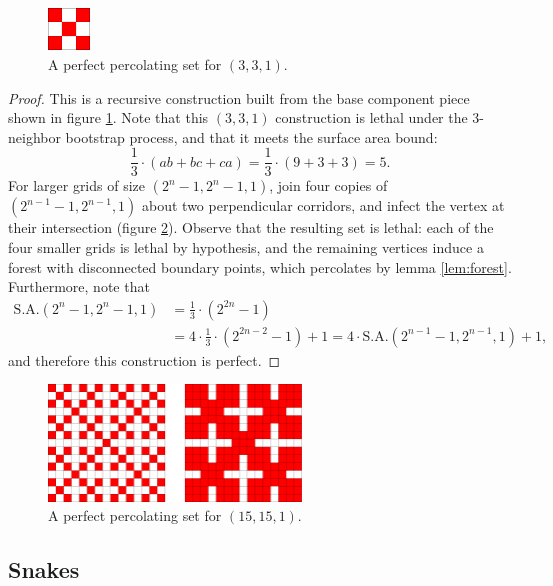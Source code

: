 \begin{figure}[]
\centering
\includegraphics[width=0.1\textwidth]{figures/7/3x3x1.pdf}
\caption{A perfect percolating set for $(3,3,1)$.}
\label{fig:3x3x1}
\end{figure} 

\begin{proof}
This is a recursive construction built from the base component piece shown in figure \ref{fig:3x3x1}. Note that this $(3,3,1)$ construction is lethal under the 3-neighbor bootstrap process, and that it meets the surface area bound:
$$\frac{1}{3} \cdot (ab+bc+ca) = \frac{1}{3} \cdot (9 + 3 + 3) = 5.$$
For larger grids of size $(2^n-1, 2^n-1, 1)$, join four copies of $(2^{n-1}-1, 2^{n-1}, 1)$ about two perpendicular corridors, and infect the vertex at their intersection (figure \ref{fig:15x15x1}). Observe that the resulting set is lethal: each of the four smaller grids is lethal by hypothesis, and the remaining vertices induce a forest with disconnected boundary points, which percolates by lemma \ref{lem:forest}. Furthermore, note that
\begin{align*}
\text{S.A.}(2^n-1,2^n-1,1) &= \frac{1}{3} \cdot (2^{2n}-1) \\
&= 4 \cdot \frac{1}{3} \cdot (2^{2n-2} -1) + 1 = 4 \cdot \text{S.A.}(2^{n-1}-1, 2^{n-1}, 1) + 1,
\end{align*}
and therefore this construction is perfect.
\end{proof}

\begin{figure}[]
\centering
\includegraphics[width=0.6\textwidth]{figures/7/15x15x1.pdf}
\caption{A perfect percolating set for $(15,15,1)$.}
\label{fig:15x15x1}
\end{figure} 

\subsection{Snakes}

